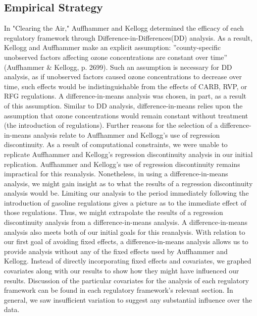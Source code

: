 \documentclass{article}
\begin{document}
\subsection {Empirical Strategy}
In "Clearing the Air," Auffhammer and Kellogg determined the efficacy of each regulatory framework through Difference-in-Differences(DD) analysis. As a result, Kellogg and Auffhammer make an explicit assumption: ”county-specific unobserved factors affecting ozone concentrations are constant over time” (Auffhammer \& Kellogg, p. 2699). Such an assumption is necessary for DD analysis, as if unobserved factors caused ozone concentrations to decrease over time, such effects would be indistinguishable from the effects of CARB, RVP, or RFG regulations. A difference-in-means analysis was chosen, in part, as a result of this assumption. Similar to DD analysis, difference-in-means relies upon the assumption that ozone concentrations would remain constant without treatment (the introduction of regulations). Further reasons for the selection of a difference-in-means analysis relate to Auffhammer and Kellogg's use of regression discontinuity. As a result of computational constraints, we were unable to replicate Auffhammer and Kellogg's regression discontinuity analysis in our initial replication. Auffhammer and Kellogg's use of regression discontinuity remains impractical for this reanalysis. Nonetheless, in using a difference-in-means analysis, we might gain insight as to what the results of a regression discontinuity analysis would be. Limiting our analysis to the period immediately following the introduction of gasoline regulations gives a picture as to the immediate effect of those regulations. Thus, we might extrapolate the results of a regression discontinuity analysis from a difference-in-means analysis. A difference-in-means analysis also meets both of our initial goals for this reanalysis. With relation to our first goal of avoiding fixed effects, a difference-in-means analysis allows us to provide analysis without any of the fixed effects used by Auffhammer and Kellogg. Instead of directly incorporating fixed effects and covariates, we graphed  covariates along with our results to show how they might have influenced our results. Discussion of the particular covariates for the analysis of each regulatory framework can be found in each regulatory framework's relevant section. In general, we saw insufficient variation to suggest any substantial influence over the data. 
\end{document}
